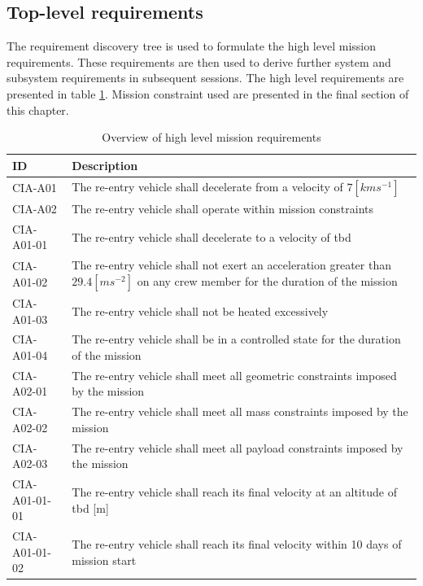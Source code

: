 \subsection{Top-level requirements}
The requirement discovery tree is used to formulate the high level mission requirements. These requirements are then used to derive further system and subsystem requirements in subsequent sessions. The high level requirements are presented in table \ref{tab:toplevelreq}. Mission constraint used are presented in the final section of this chapter.

\begin{table}[H]
	\caption{Overview of high level mission requirements} \label{tab:toplevelreq}
	\begin{tabular}{|p{}|p{}|}
    \hline
    ID          & Description                                                                                                      \\ \hline \hline
    CIA-A01 & The re-entry vehicle shall decelerate from a velocity of $7[kms^{-1}]$ \\ \hline
    CIA-A02 & The re-entry vehicle shall operate within mission constraints                                               \\ \hline
    CIA-A01-01 & The re-entry vehicle shall decelerate to a velocity of \gls{tbd}     \\ \hline
    CIA-A01-02 & The re-entry vehicle shall not exert an acceleration greater than $29.4 [ms^{-2}]$ on any crew member for the duration of the mission			\\ \hline
    CIA-A01-03 & The re-entry vehicle shall not be heated excessively  \\ \hline
    CIA-A01-04 & The re-entry vehicle shall be in a controlled state for the duration of the mission                            \\ \hline
    CIA-A02-01 & The re-entry vehicle shall meet all geometric constraints imposed by the mission                           \\ \hline
    CIA-A02-02 & The re-entry vehicle shall meet all mass constraints imposed by the mission                                      \\ \hline
	CIA-A02-03 & The re-entry vehicle shall meet all payload constraints imposed by the mission \\ \hline
	CIA-A01-01-01 & The re-entry vehicle shall reach its final velocity at an altitude of \gls{tbd} [m] \\ \hline
	CIA-A01-01-02 & The re-entry vehicle shall reach its final velocity within 10 days of mission start \\ \hline
    \end{tabular}
\end{table}










